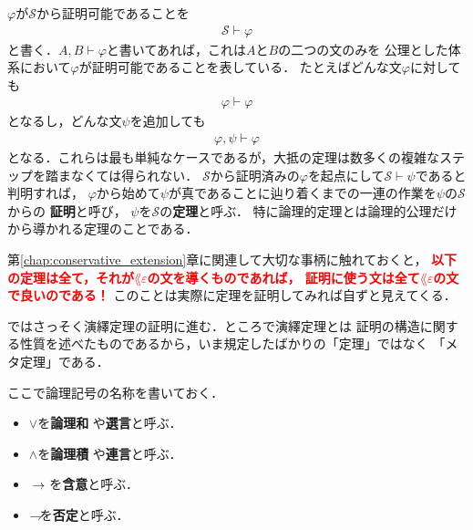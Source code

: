 	$\varphi$が$\mathscr{S}$から証明可能であることを
	\begin{align}
		\mathscr{S} \vdash \varphi
	\end{align}
	と書く．$A,B \vdash \varphi$と書いてあれば，これは$A$と$B$の二つの文のみを
	公理とした体系において$\varphi$が証明可能であることを表している．
	たとえばどんな文$\varphi$に対しても
	\begin{align}
		\varphi \vdash \varphi
	\end{align}
	となるし，どんな文$\psi$を追加しても
	\begin{align}
		\varphi,\psi \vdash \varphi
	\end{align}
	となる．これらは最も単純なケースであるが，大抵の定理は数多くの複雑なステップを踏まなくては得られない．
	$\mathscr{S}$から証明済みの$\varphi$を起点にして$\mathscr{S} \vdash \psi$であると判明すれば，
	$\varphi$から始めて$\psi$が真であることに辿り着くまでの一連の作業を$\psi$の$\mathscr{S}$からの
	{\bf 証明}と呼び，
	$\psi$を$\mathscr{S}$の{\bf 定理}と呼ぶ．
	特に論理的定理とは論理的公理だけから導かれる定理のことである．
	
	\begin{screen}
		\begin{rem}
		\label{rem:deduction_of_L_epsilon_sentence}
			第\ref{chap:conservative_extension}章に関連して大切な事柄に触れておくと，
			\textcolor{red}{{\bf 以下の定理は全て，それが$\lang{\varepsilon}$の文を導くものであれば，
			証明に使う文は全て$\lang{\varepsilon}$の文で良いのである！}}
			このことは実際に定理を証明してみれば自ずと見えてくる．
		\end{rem}
	\end{screen}
	
	ではさっそく演繹定理の証明に進む．ところで演繹定理とは
	証明の構造に関する性質を述べたものであるから，いま規定したばかりの「定理」ではなく
	「メタ定理」である．
	
	ここで論理記号の名称を書いておく．
	\begin{itemize}
		\item $\vee$を{\bf 論理和}
			や{\bf 選言}と呼ぶ．
		\item $\wedge$を{\bf 論理積}
			や{\bf 連言}と呼ぶ．
		\item $\hspace{0.25em}\rightarrow\hspace{0.25em}$を{\bf 含意}と呼ぶ．
		\item $\rightharpoondown\hspace{-0.25em}$を{\bf 否定}と呼ぶ．
	\end{itemize}
	
